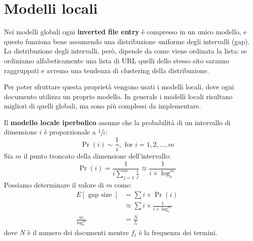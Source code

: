 \documentclass[\main/main.tex]{subfiles}
\begin{document}
\chapter{Modelli locali}
\begin{observation}
    Nei modelli globali ogni \textbf{inverted file entry} è compresso in un unico modello, e questo funziona bene assumendo una distribuzione uniforme degli intervalli (gap). La distribuzione degli intervalli, però, dipende da come viene ordinata la lista: se ordiniamo alfabeticamente una lista di URL quelli dello stesso sito saranno raggruppati e avremo una tendenza di clustering della distribuzione. 
    
    Per poter sfruttare questa proprietà vengono usati i modelli locali, dove ogni documento utilizza un proprio modello. In generale i modelli locali risultano migliori di quelli globali, ma sono più complessi da implementare.
\end{observation}
\begin{definition}
    Il \textbf{modello locale iperbolico} assume che la probabilità di un intervallo di dimensione \(i\) è proporzionale a \(\sfrac{1}{i}\):
    \[
        \operatorname{Pr}(i) \sim \frac{1}{i}, \text { for } i=1,2, \ldots, m
    \]
    Sia \(m\) il punto troncato della dimensione dell'intervallo:
    \[
        \operatorname{Pr}(i)=\frac{1}{i \sum_{j=1}^{m} \frac{1}{j}} \approx \frac{1}{i \times \log _{e}^{m}}
    \]
    Possiamo determinare il valore di \(m\) come:
    \[
        \begin{aligned} E[\text { gap size }] &=\sum i \times \operatorname{Pr}(i) \\ & \approx \sum i \times \frac{1}{i \times \log _{e}^{m}} \\ \frac{m}{\log _{e}^{m}} &=\frac{N}{f_{t}} \end{aligned}
    \]
    dove \(N\) è il numero dei documenti mentre \(f_t\) è la frequenza dei termini.
\end{definition}
\end{document}
